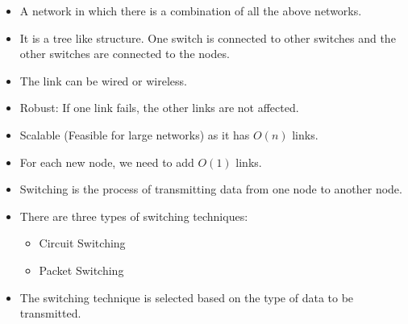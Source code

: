 \documentclass[a4paper, twoside]{report}
\begin{document}
\begin{itemize}
    \item A network in which there is a combination of all the above networks.
    \item It is a tree like structure. One switch is connected to other switches and the other switches are connected to the nodes.
    \item The link can be wired or wireless.
    \item Robust: If one link fails, the other links are not affected.
    \item Scalable (Feasible for large networks) as it has $O(n)$ links.
    \item For each new node, we need to add $O(1)$ links.
\end{itemize}



\begin{itemize}
    \item Switching is the process of transmitting data from one node to another node.
    \item There are three types of switching techniques: \begin{itemize}
        \item Circuit Switching
        \item Packet Switching
        \end{itemize}
    \item The switching technique is selected based on the type of data to be transmitted.


            
\end{itemize}
\end{document}
